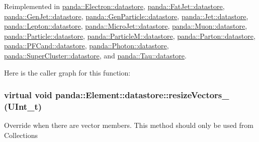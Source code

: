 Reimplemented in \hyperlink{structpanda_1_1Electron_1_1datastore_acd47db6bdd5b2308f4f1b02a9b1bd97f}{panda::Electron::datastore}, \hyperlink{structpanda_1_1FatJet_1_1datastore_a8dd1a45fedb7d5ec627601b23f0dc2d5}{panda::FatJet::datastore}, \hyperlink{structpanda_1_1GenJet_1_1datastore_aea7b516e513fbdf5cc2c6f67d0ae3dba}{panda::GenJet::datastore}, \hyperlink{structpanda_1_1GenParticle_1_1datastore_a7c4f6ca82174720a87fa2371f40000d7}{panda::GenParticle::datastore}, \hyperlink{structpanda_1_1Jet_1_1datastore_ae6ac289071c894912c7a60cdd224509f}{panda::Jet::datastore}, \hyperlink{structpanda_1_1Lepton_1_1datastore_a3288e551dbce7062e6f2e4e88f1a6a40}{panda::Lepton::datastore}, \hyperlink{structpanda_1_1MicroJet_1_1datastore_a9722ed3783e57fb5e55307d72ebddb15}{panda::MicroJet::datastore}, \hyperlink{structpanda_1_1Muon_1_1datastore_ac48b5f3d5fb73f9e54f0f810d11f8010}{panda::Muon::datastore}, \hyperlink{structpanda_1_1Particle_1_1datastore_a9fa2653f0e8b59a5cbc752beaf6b7a57}{panda::Particle::datastore}, \hyperlink{structpanda_1_1ParticleM_1_1datastore_ad6986990fa55f1c6ca4e92db28486922}{panda::ParticleM::datastore}, \hyperlink{structpanda_1_1Parton_1_1datastore_affc6fef2d7648b73182dbb91d5043b36}{panda::Parton::datastore}, \hyperlink{structpanda_1_1PFCand_1_1datastore_a9fc7ec497f046c098b89eb04ee508174}{panda::PFCand::datastore}, \hyperlink{structpanda_1_1Photon_1_1datastore_a05f8dcdf1df8a1e105ca3167c2ab94e2}{panda::Photon::datastore}, \hyperlink{structpanda_1_1SuperCluster_1_1datastore_afc373864f03ba4e73ef1237f88bcfd4e}{panda::SuperCluster::datastore}, and \hyperlink{structpanda_1_1Tau_1_1datastore_ad3b1c3b063d8091225a37315a6dfb998}{panda::Tau::datastore}.

Here is the caller graph for this function:\hypertarget{structpanda_1_1Element_1_1datastore_a4696a188a70355c43a5482f895433230}{
\subsubsection[{resizeVectors\_\-}]{\setlength{\rightskip}{0pt plus 5cm}virtual void panda::Element::datastore::resizeVectors\_\- (UInt\_\-t)}}
\label{structpanda_1_1Element_1_1datastore_a4696a188a70355c43a5482f895433230}


Override when there are vector members. This method should only be used from Collections 

